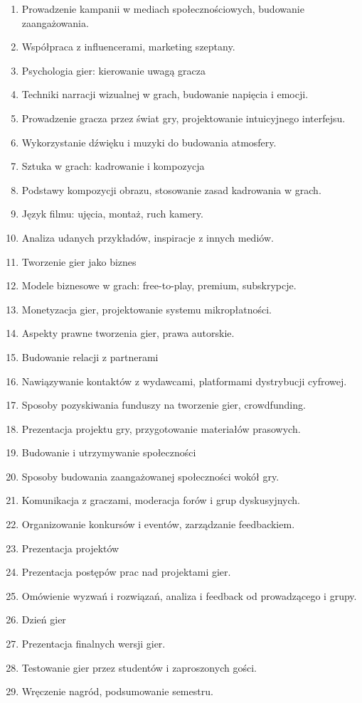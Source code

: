 \documentclass[12pt, a4paper]{article}
\begin{document}
\begin{enumerate}
  \item Prowadzenie kampanii w mediach społecznościowych, budowanie zaangażowania.
  \item Współpraca z influencerami, marketing szeptany.
  \item Psychologia gier: kierowanie uwagą gracza
  \item Techniki narracji wizualnej w grach, budowanie napięcia i emocji.
  \item Prowadzenie gracza przez świat gry, projektowanie intuicyjnego interfejsu.
  \item Wykorzystanie dźwięku i muzyki do budowania atmosfery.
  \item Sztuka w grach: kadrowanie i kompozycja
  \item Podstawy kompozycji obrazu, stosowanie zasad kadrowania w grach.
  \item Język filmu: ujęcia, montaż, ruch kamery.
  \item Analiza udanych przykładów, inspiracje z innych mediów.
  \item Tworzenie gier jako biznes
  \item Modele biznesowe w grach: free-to-play, premium, subskrypcje.
  \item Monetyzacja gier, projektowanie systemu mikropłatności.
  \item Aspekty prawne tworzenia gier, prawa autorskie.
  \item Budowanie relacji z partnerami
  \item Nawiązywanie kontaktów z wydawcami, platformami dystrybucji cyfrowej.
  \item Sposoby pozyskiwania funduszy na tworzenie gier, crowdfunding.
  \item Prezentacja projektu gry, przygotowanie materiałów prasowych.
  \item Budowanie i utrzymywanie społeczności
  \item Sposoby budowania zaangażowanej społeczności wokół gry.
  \item Komunikacja z graczami, moderacja forów i grup dyskusyjnych.
  \item Organizowanie konkursów i eventów, zarządzanie feedbackiem.
  \item Prezentacja projektów
  \item Prezentacja postępów prac nad projektami gier.
  \item Omówienie wyzwań i rozwiązań, analiza i feedback od prowadzącego i grupy.
  \item Dzień gier
  \item Prezentacja finalnych wersji gier.
  \item Testowanie gier przez studentów i zaproszonych gości.
  \item Wręczenie nagród, podsumowanie semestru.
\end{enumerate}
\end{document}
